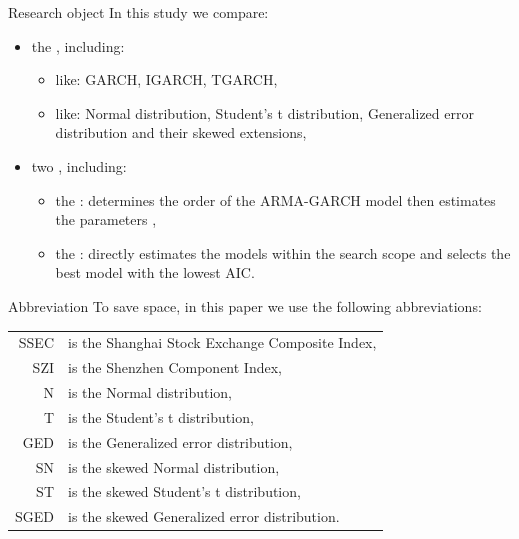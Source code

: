\begin{frame}{Research object}
  In this study we compare:
  \begin{itemize}
    \item the , including: 
      \begin{itemize}
        \item {} like: GARCH, IGARCH, TGARCH,
        \item {} like: Normal distribution, Student's t distribution, Generalized error distribution and their skewed extensions,
      \end{itemize}
    \item two , including: 
      \begin{itemize}
        \item the  \cite{tsay2005_financial_time_series}: determines the order of the ARMA-GARCH model  then estimates the parameters ,
        \item the : directly estimates  the models within the search scope and selects the best model with the lowest AIC.
      \end{itemize}
  \end{itemize}
\end{frame}

\begin{frame}{Abbreviation}
  To save space, in this paper we use the following abbreviations:

  \begin{table}[htbp]
    \begin{tabular}{@{\hspace*{2.8em}}rl}
    SSEC & is the Shanghai Stock Exchange Composite Index, \\
    SZI & is the Shenzhen Component Index, \\
    N   & is the Normal distribution, \\
    T   & is the Student's t distribution, \\
    GED & is the Generalized error distribution, \\
    SN  & is the skewed Normal distribution, \\
    ST  & is the skewed Student's t distribution, \\
    SGED & is the skewed Generalized error distribution. \\
    \end{tabular}
  \end{table}
\end{frame}

